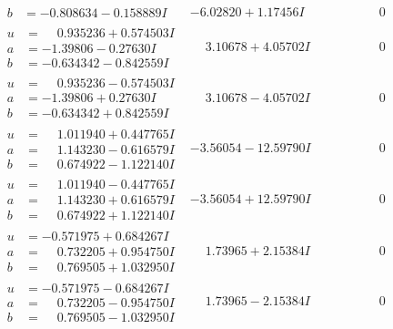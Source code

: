 \documentclass[1p]{elsarticle_modified}
\theoremstyle{definition}
\begin{document}
$$\begin{array}{c|c|c}
\begin{aligned}
b &= -0.808634 - 0.158889 I\end{aligned}
 & -6.02820 + 1.17456 I & \phantom{-0.000000 } 0 \\ \hline\begin{aligned}
u &= \phantom{-}0.935236 + 0.574503 I \\
a &= -1.39806 - 0.27630 I \\
b &= -0.634342 - 0.842559 I\end{aligned}
 & \phantom{-}3.10678 + 4.05702 I & \phantom{-0.000000 } 0 \\ \hline\begin{aligned}
u &= \phantom{-}0.935236 - 0.574503 I \\
a &= -1.39806 + 0.27630 I \\
b &= -0.634342 + 0.842559 I\end{aligned}
 & \phantom{-}3.10678 - 4.05702 I & \phantom{-0.000000 } 0 \\ \hline\begin{aligned}
u &= \phantom{-}1.011940 + 0.447765 I \\
a &= \phantom{-}1.143230 - 0.616579 I \\
b &= \phantom{-}0.674922 - 1.122140 I\end{aligned}
 & -3.56054 - 12.59790 I & \phantom{-0.000000 } 0 \\ \hline\begin{aligned}
u &= \phantom{-}1.011940 - 0.447765 I \\
a &= \phantom{-}1.143230 + 0.616579 I \\
b &= \phantom{-}0.674922 + 1.122140 I\end{aligned}
 & -3.56054 + 12.59790 I & \phantom{-0.000000 } 0 \\ \hline\begin{aligned}
u &= -0.571975 + 0.684267 I \\
a &= \phantom{-}0.732205 + 0.954750 I \\
b &= \phantom{-}0.769505 + 1.032950 I\end{aligned}
 & \phantom{-}1.73965 + 2.15384 I & \phantom{-0.000000 } 0 \\ \hline\begin{aligned}
u &= -0.571975 - 0.684267 I \\
a &= \phantom{-}0.732205 - 0.954750 I \\
b &= \phantom{-}0.769505 - 1.032950 I\end{aligned}
 & \phantom{-}1.73965 - 2.15384 I & \phantom{-0.000000 } 0 \\ \hline\begin{aligned}

\end{aligned}
\end{array}$$
\end{document}
